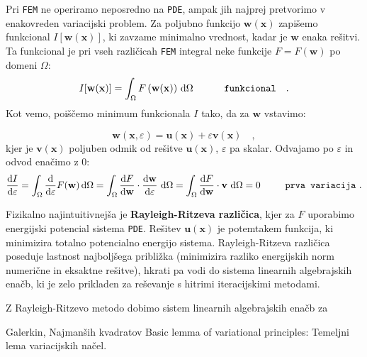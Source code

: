 Pri \texttt{FEM} ne operiramo neposredno na \texttt{PDE}, ampak jih najprej pretvorimo v enakovreden variacijski problem. Za poljubno funkcijo $\mathbf{w}(\mathbf{x})$ zapišemo funkcional $I[\mathbf{w}(\mathbf{x})]$, ki  zavzame minimalno vrednost, kadar je $\mathbf{w}$ enaka rešitvi. Ta funkcional je pri vseh različicah \texttt{FEM} integral neke funkcije $F = F\left(\mathbf{w}\right)$ po domeni $\Omega$:
\begin{equation}
	I[\mathbf{w}(\mathbf{x})] = \int_{\Omega} F\left(\mathbf{w}(\mathbf{x})\right) \, \mathrm{d} \Omega \hspace{1.1cm} \texttt{funkcional} \quad .
\end{equation}
Kot vemo, poiščemo minimum funkcionala $I$ tako, da za $\mathbf{w}$ vstavimo:

\setlength{\textheight}{26.5cm}			%
\pagebreak
\setlength{\topmargin}{1.6cm}			%
\setlength{\headheight}{0.0cm}
\setlength{\headsep}{0.0cm}			%
\fancyhf{}
\fancyfoot[C]{\thepage}
\begin{equation}
	\mathbf{w}(\mathbf{x}, \varepsilon) = \mathbf{u}(\mathbf{x}) + \varepsilon \mathbf{v}(\mathbf{x}) \quad ,
\end{equation}
kjer je $\mathbf{v}(\mathbf{x})$ poljuben odmik od rešitve $\mathbf{u}(\mathbf{x})$, $\varepsilon$ pa skalar. Odvajamo po $\varepsilon$ in odvod enačimo z 0:
\begin{equation}
\frac{\mathrm{d} I}{\mathrm{d} \varepsilon} = \int_{\Omega} \frac{\mathrm{d}}{\mathrm{d} \varepsilon} F(\mathbf{w}) \, \mathrm{d} \Omega = \int_{\Omega} \frac{\mathrm{d} F}{\mathrm{d} \mathbf{w}} \cdot \frac{\mathrm{d} \mathbf{w}}{\mathrm{d} \varepsilon} \ \mathrm{d} \Omega = \int_{\Omega} \frac{\mathrm{d} F}{\mathrm{d} \mathbf{w}} \cdot \mathbf{v} \ \mathrm{d} \Omega = 0 \hspace{0.9cm} \texttt{prva variacija} \ .
\end{equation}

Fizikalno najintuitivnejša je \textbf{Rayleigh-Ritzeva različica}, kjer za $F$ uporabimo energijski potencial sistema \texttt{PDE}. Rešitev $\mathbf{u}(\mathbf{x})$ je potemtakem funkcija, ki minimizira totalno potencialno energijo sistema. Rayleigh-Ritzeva različica poseduje lastnost najboljšega približka (minimizira razliko energijskih norm numerične in eksaktne rešitve), hkrati pa vodi do sistema linearnih algebrajskih enačb, ki je zelo prikladen za reševanje s hitrimi iteracijskimi metodami.

Z Rayleigh-Ritzevo metodo dobimo sistem linearnih algebrajskih enačb za 

Galerkin, Najmanših kvadratov \cite{JiangB-LSFEM}
Basic lemma of variational principles: Temeljni lema variacijskih načel.
